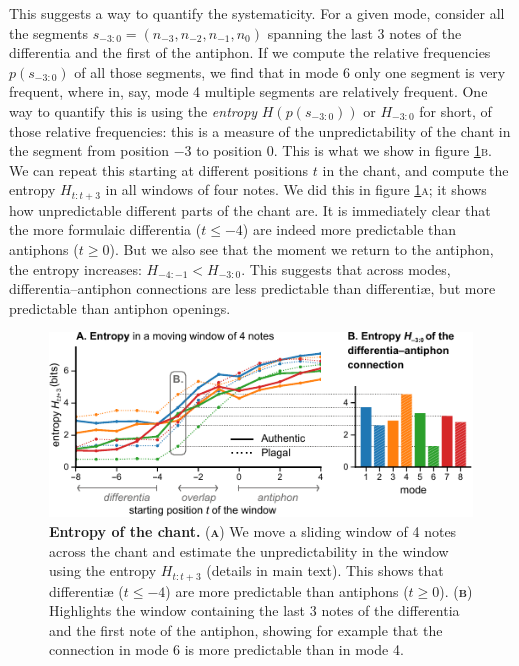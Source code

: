 \documentclass[sigconf,screen]{acmart}
\begin{document}
This suggests a way to quantify the systematicity.
For a given mode, consider all the segments $s_{-3:0} = (n_{-3}, n_{-2}, n_{-1}, n_0)$ spanning the last 3 notes of the differentia and the first of the antiphon.
If we compute the relative frequencies $p(s_{-3:0})$ of all those segments, we find that in mode 6 only one segment is very frequent, where in, say, mode 4 multiple segments are relatively frequent.
One way to quantify this is using the \emph{entropy} $H(p(s_{-3:0}))$ or $H_{-3:0}$ for short, of those relative frequencies: this is a measure of the unpredictability of the chant in the segment from position $-3$ to position $0$.
This is what we show in figure \ref{fig:entropy}\textsc{b}.
We can repeat this starting at different positions $t$ in the chant, and compute the entropy $H_{t:t+3}$ in all windows of four notes.
We did this in figure \ref{fig:entropy}\textsc{a}; it shows how unpredictable different parts of the chant are.
It is immediately clear that the more formulaic differentia ($t \le -4$) are indeed more predictable than antiphons ($t\ge 0$).
But we also see that the moment we return to the antiphon, the entropy increases: $H_{-4:-1}<H_{-3:0}$.
This suggests that across modes, differentia--antiphon connections are less predictable than differentiæ, but more predictable than antiphon openings.


\begin{figure}[t]
  \centering
  \includegraphics[width=\linewidth]{figures/fig06-entropy.pdf}
  \caption{\normalfont%
    \textbf{Entropy of the chant.}
    (\textbf{\textsc{a}}) We move a sliding window of 4 notes across the chant and estimate the unpredictability in the window using the entropy $H_{t:t+3}$ (details in main text).
    This shows that differentiæ ($t\le -4$) are more predictable than antiphons ($t \ge 0$).
    (\textbf{\textsc{b}}) Highlights the window containing the last 3 notes of the differentia and the first note of the antiphon, showing for example that the connection in mode 6 is more predictable than in mode 4.
    }%
    \label{fig:entropy}
\end{figure}
\end{document}
